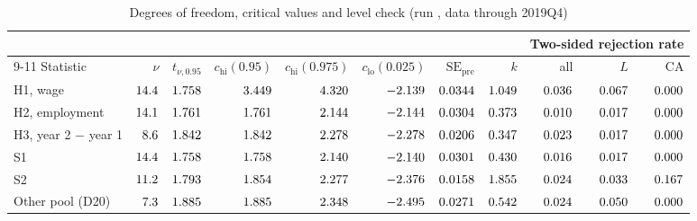 \begin{table}[tbp]
\centering
\caption{Degrees of freedom, critical values and level check (run , data through 2019Q4)}
\label{tab:inference}
\small
\setlength{\tabcolsep}{3.2pt}
\begin{tabular}{@{}lrrrrrrrrrr@{}}
\toprule
& & & & & & & & \multicolumn{3}{c}{Two-sided rejection rate} \\
\cmidrule(l){9-11}
Statistic & $\nu$ & $t_{\nu,0.95}$ & $c_{\mathrm{hi}}(0.95)$ & $c_{\mathrm{hi}}(0.975)$ & $c_{\mathrm{lo}}(0.025)$ & $\mathrm{SE}_{\mathrm{pre}}$ & $k$ & all & $L$ & CA \\
\midrule
H1, wage & $14.4$ & $1.758$ & $3.449$ & $4.320$ & $-2.139$ & $0.0344$ & $1.049$ & $0.036$ & $0.067$ & $0.000$ \\
H2, employment & $14.1$ & $1.761$ & $1.761$ & $2.144$ & $-2.144$ & $0.0304$ & $0.373$ & $0.010$ & $0.017$ & $0.000$ \\
H3, year 2 $-$ year 1 & $8.6$ & $1.842$ & $1.842$ & $2.278$ & $-2.278$ & $0.0206$ & $0.347$ & $0.023$ & $0.017$ & $0.000$ \\
S1 & $14.4$ & $1.758$ & $1.758$ & $2.140$ & $-2.140$ & $0.0301$ & $0.430$ & $0.016$ & $0.017$ & $0.000$ \\
S2 & $11.2$ & $1.793$ & $1.854$ & $2.277$ & $-2.376$ & $0.0158$ & $1.855$ & $0.024$ & $0.033$ & $0.167$ \\
Other pool (D20) & $7.3$ & $1.885$ & $1.885$ & $2.348$ & $-2.495$ & $0.0271$ & $0.542$ & $0.024$ & $0.050$ & $0.000$ \\
\bottomrule
\end{tabular}


\end{table}
